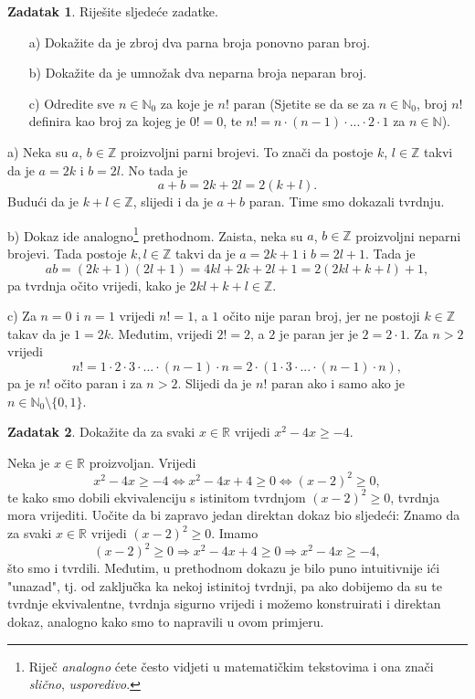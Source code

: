 \documentclass{book}
\renewenvironment{proof}{%
    \vspace{-\parskip}\begin{oldproof}%
    }{%
    \end{oldproof}%
}
\theoremstyle{definition}
\theoremstyle{definition}
\newtheorem{exercise}{Zadatak}
\theoremstyle{remark}
\begin{document}
\begin{exercise}
Riješite sljedeće zadatke. \begin{itemize}

\item[a)] Dokažite da je zbroj dva parna broja ponovno paran broj.
\item[b)] Dokažite da je umnožak dva neparna broja neparan broj.
\item[c)] Odredite sve $n\in \mathbb{N}_0$ za koje je $n!$ paran (Sjetite se da se za $n\in \mathbb{N}_0$, broj $n!$ definira kao broj za kojeg je $0!=0$, te $n!=n\cdot (n-1)\cdot ...\cdot 2\cdot 1$ za $n\in \mathbb{N}$).
\end{itemize}
\end{exercise}
\begin{proof}[Rješenje]
a) Neka su $a$, $b\in \mathbb{Z}$ proizvoljni parni brojevi. To znači da postoje $k$, $l\in \mathbb{Z}$ takvi da je $a=2k$ i $b=2l$. No tada je $$a+b=2k+2l=2(k+l).$$ Budući da je $k+l\in \mathbb{Z}$, slijedi i da je $a+b$ paran. Time smo dokazali tvrdnju.

b) Dokaz ide analogno\footnote{Riječ \textit{analogno} ćete često vidjeti u matematičkim tekstovima i ona znači \textit{slično}, \textit{usporedivo}.} prethodnom. Zaista, neka su $a$, $b\in \mathbb{Z}$ proizvoljni neparni brojevi. Tada postoje $k, l\in \mathbb{Z}$ takvi da je $a=2k+1$ i $b=2l+1$. Tada je
$$ab=(2k+1)(2l+1)=4kl+2k+2l+1=2(2kl+k+l)+1,$$
pa tvrdnja očito vrijedi, kako je $2kl+k+l\in \mathbb{Z}$.

c) Za $n=0$ i $n=1$ vrijedi $n!=1$, a $1$ očito nije paran broj, jer ne postoji $k\in \mathbb{Z}$ takav da je $1=2k$. Međutim, vrijedi $2!=2$, a $2$ je paran jer je $2=2\cdot 1$. Za $n>2$ vrijedi
$$n!=1\cdot 2\cdot 3\cdot ...\cdot (n-1)\cdot n=2\cdot (1\cdot 3\cdot ...\cdot (n-1)\cdot n),$$
pa je $n!$ očito paran i za $n>2$. Slijedi da je $n!$ paran ako i samo ako je $n\in \mathbb{N}_0\setminus \{0, 1\}$.
\end{proof}
\begin{exercise}
Dokažite da za svaki $x\in \mathbb{R}$ vrijedi $x^2-4x\geq -4$.
\end{exercise}
\begin{proof}[Rješenje]
Neka je $x\in \mathbb{R}$ proizvoljan. Vrijedi
$$x^2-4x\geq -4\Leftrightarrow x^2-4x+4\geq 0\Leftrightarrow (x-2)^2\geq 0,$$
te kako smo dobili ekvivalenciju s istinitom tvrdnjom $(x-2)^2\geq 0$, tvrdnja mora vrijediti. Uočite da bi zapravo jedan direktan dokaz bio sljedeći: Znamo da za svaki $x\in \mathbb{R}$ vrijedi $(x-2)^2\geq 0$. Imamo
$$(x-2)^2\geq 0\Rightarrow x^2-4x+4\geq 0\Rightarrow x^2-4x\geq -4,$$
što smo i tvrdili. Međutim, u prethodnom dokazu je bilo puno intuitivnije ići "unazad", tj. od zaključka ka nekoj istinitoj tvrdnji, pa ako dobijemo da su te tvrdnje ekvivalentne, tvrdnja sigurno vrijedi i možemo konstruirati i direktan dokaz, analogno kako smo to napravili u ovom primjeru.
\end{proof}
\end{document}
